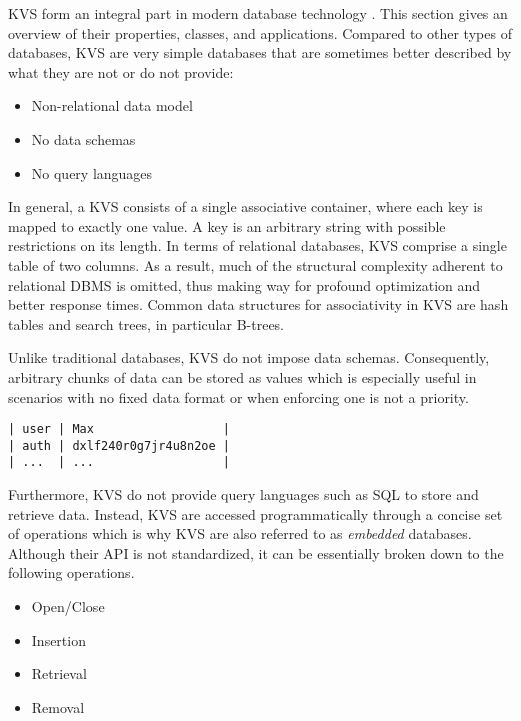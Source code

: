 \ac{KVS} form an integral part in modern database technology \cite{fiebig2016one}.
This section gives an overview of their properties, classes, and applications.
Compared to other types of databases, \ac{KVS} are very simple databases that are
sometimes better described by what they are not or do not provide:

\begin{itemize}
    \item Non-relational data model
    \item No data schemas
    \item No query languages
\end{itemize}

In general, a \ac{KVS} consists of a single associative container, where each key is
mapped to exactly one value. A key is an arbitrary string with possible
restrictions on its length. In terms of relational databases, \ac{KVS} comprise a
single table of two columns. As a result, much of the structural complexity
adherent to relational \ac{DBMS} is omitted, thus making way for profound
optimization and better response times. Common data structures for associativity
in \ac{KVS} are hash tables and search trees, in particular B-trees.

Unlike traditional databases, \ac{KVS} do not impose data schemas. Consequently,
arbitrary chunks of data can be stored as values which is especially useful
in scenarios with no fixed data format or when enforcing one is not a priority.

\begin{lstlisting}
| user | Max                  |
| auth | dxlf240r0g7jr4u8n2oe |
| ...  | ...                  |
\end{lstlisting}

Furthermore, \ac{KVS} do not provide query languages such as SQL to
store and retrieve data. Instead, \ac{KVS} are accessed programmatically through a
concise set of operations which is why \ac{KVS} are also referred to as
\emph{embedded} databases. Although their \ac{API} is not standardized, it can be
essentially broken down to the following operations.

\begin{itemize}
    \item Open/Close
    \item Insertion
    \item Retrieval
    \item Removal
\end{itemize}


